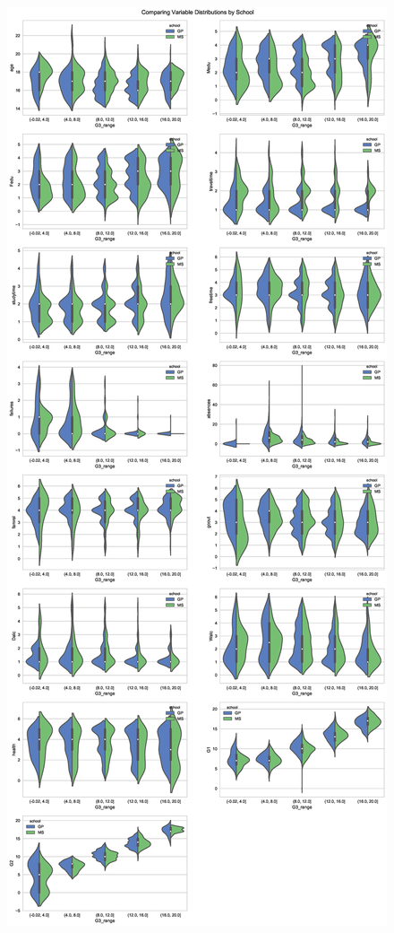 \documentclass[12pt]{article}
\begin{document}
\begin{figure}[H]
\centering
\includegraphics[width=\textwidth,height=0.7\textheight,keepaspectratio]{figures/distrbyschool.eps}
\end{figure}
\end{document}
